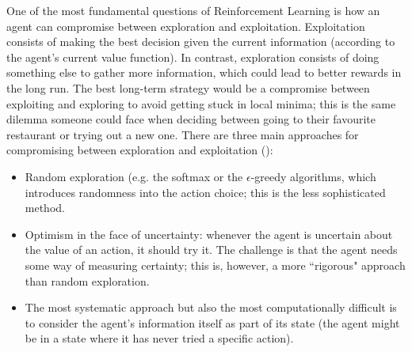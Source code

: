 One of the most fundamental questions of Reinforcement Learning is how an agent can compromise between exploration and exploitation. Exploitation consists of making the best decision given the current information (according to the agent's current value function). In contrast, exploration consists of doing something else to gather more information, which could lead to better rewards in the long run. \newline
The best long-term strategy would be a compromise between exploiting and exploring to avoid getting stuck in local minima; this is the same dilemma someone could face when deciding between going to their favourite restaurant or trying out a new one. There are three main approaches for compromising between exploration and exploitation (\cite{silver2015}): 
\begin{itemize}
	\item Random exploration (e.g. the softmax or the $\epsilon$-greedy algorithms, which introduces randomness into the action choice; this is the less sophisticated method.
	\item Optimism in the face of uncertainty: whenever the agent is uncertain about the value of an action, it should try it. The challenge is that the agent needs some way of measuring certainty; this is, however, a more ``rigorous" approach than random exploration.
	\item The most systematic approach but also the most computationally difficult is to consider the agent's information itself as part of its state (the agent might be in a state where it has never tried a specific action).
\end{itemize}


